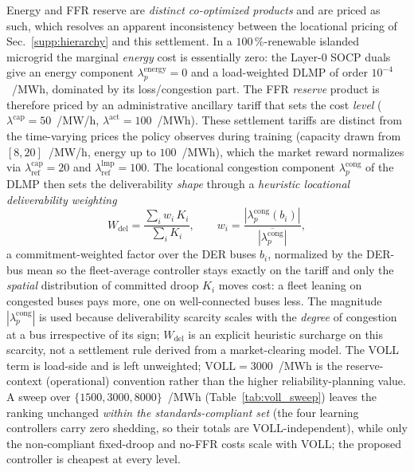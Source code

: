 \documentclass[lettersize,journal]{IEEEtran}
\begin{document}
Energy and FFR reserve are \emph{distinct co-optimized products} and are priced as such, which resolves an apparent inconsistency between the locational pricing of Sec.~\ref{supp:hierarchy} and this settlement. In a $100\,\%$-renewable islanded microgrid the marginal \emph{energy} cost is essentially zero: the Layer-0 SOCP duals give an energy component $\lambda_p^{\mathrm{energy}}=0$ and a load-weighted DLMP of order $10^{-4}$~\texteuro/MWh, dominated by its loss/congestion part. The FFR \emph{reserve} product is therefore priced by an administrative ancillary tariff that sets the cost \emph{level} ($\lambda^{\mathrm{cap}}=50$~\texteuro/MW/h, $\lambda^{\mathrm{act}}=100$~\texteuro/MWh). These settlement tariffs are distinct from the time-varying prices the policy observes during training (capacity drawn from $[8,20]$~\texteuro/MW/h, energy up to $100$~\texteuro/MWh), which the market reward normalizes via $\lambda^{\mathrm{cap}}_{\mathrm{ref}}=20$ and $\lambda^{\mathrm{lmp}}_{\mathrm{ref}}=100$. The locational congestion component $\lambda_p^{\mathrm{cong}}$ of the DLMP then sets the deliverability \emph{shape} through a \emph{heuristic locational deliverability weighting}
\begin{equation}
  W_{\mathrm{del}}=\frac{\sum_i w_i\,K_i}{\sum_i K_i},\qquad
  w_i=\frac{|\lambda_p^{\mathrm{cong}}(b_i)|}{\overline{|\lambda_p^{\mathrm{cong}}|}},
  \label{eq:wdel}
\end{equation}
a commitment-weighted factor over the DER buses $b_i$, normalized by the DER-bus mean so the fleet-average controller stays exactly on the tariff and only the \emph{spatial} distribution of committed droop $K_i$ moves cost: a fleet leaning on congested buses pays more, one on well-connected buses less. The magnitude $|\lambda_p^{\mathrm{cong}}|$ is used because deliverability scarcity scales with the \emph{degree} of congestion at a bus irrespective of its sign; $W_{\mathrm{del}}$ is an explicit heuristic surcharge on this scarcity, not a settlement rule derived from a market-clearing model. The VOLL term is load-side and is left unweighted; $\mathrm{VOLL}=3000$~\texteuro/MWh is the reserve-context (operational) convention rather than the higher reliability-planning value. A sweep over $\{1500,3000,8000\}$~\texteuro/MWh (Table~\ref{tab:voll_sweep}) leaves the ranking unchanged \emph{within the standards-compliant set} (the four learning controllers carry zero shedding, so their totals are VOLL-independent), while only the non-compliant fixed-droop and no-FFR costs scale with VOLL; the proposed controller is cheapest at every level.
\end{document}
